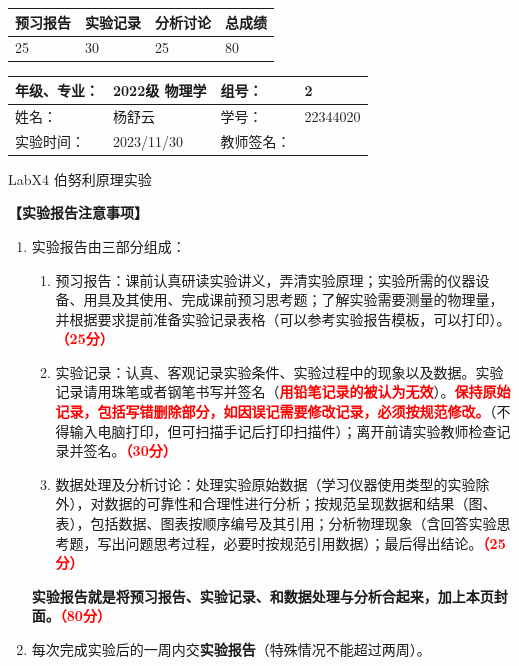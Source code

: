 \documentclass[dvipsnames, svgnames,a4paper,11pt]{article}
\begin{document}
	
	
	
	\begin{table}
		\renewcommand\arraystretch{1.7}
		\begin{tabularx}{\textwidth}{
				|X|X|X|X
				|X|X|X|X|}
			\hline
			\multicolumn{2}{|c|}{预习报告}&\multicolumn{2}{|c|}{实验记录}&\multicolumn{2}{|c|}{分析讨论}&\multicolumn{2}{|c|}{总成绩}\\
			\hline
			\LARGE25 & & \LARGE30 & & \LARGE25 & & \LARGE80 & \\
			\hline
		\end{tabularx}
	\end{table}
	
	\begin{table}
		\renewcommand\arraystretch{1.7}
		\begin{tabularx}{\textwidth}{|X|X|X|X|}
			\hline
			年级、专业： & 2022级 物理学 &组号： & 2\\
			\hline
			姓名： & 杨舒云  & 学号： & 22344020\\
			\hline
			实验时间： & 2023/11/30 & 教师签名： & \\
			\hline
		\end{tabularx}
	\end{table}
	
	\begin{center}
		\LARGE LabX4 \quad 伯努利原理实验
	\end{center}
	
	\textbf{【实验报告注意事项】}
	\begin{enumerate}
		\item 实验报告由三部分组成：
		\begin{enumerate}
			\item 预习报告：课前认真研读实验讲义，弄清实验原理；实验所需的仪器设备、用具及其使用、完成课前预习思考题；了解实验需要测量的物理量，并根据要求提前准备实验记录表格（可以参考实验报告模板，可以打印）。\textcolor{red}{\textbf{（25分）}}
			\item 实验记录：认真、客观记录实验条件、实验过程中的现象以及数据。实验记录请用珠笔或者钢笔书写并签名（\textcolor{red}{\textbf{用铅笔记录的被认为无效}}）。\textcolor{red}{\textbf{保持原始记录，包括写错删除部分，如因误记需要修改记录，必须按规范修改。}}（不得输入电脑打印，但可扫描手记后打印扫描件）；离开前请实验教师检查记录并签名。\textcolor{red}{\textbf{（30分）}}
			\item 数据处理及分析讨论：处理实验原始数据（学习仪器使用类型的实验除外），对数据的可靠性和合理性进行分析；按规范呈现数据和结果（图、表），包括数据、图表按顺序编号及其引用；分析物理现象（含回答实验思考题，写出问题思考过程，必要时按规范引用数据）；最后得出结论。\textcolor{red}{\textbf{（25分）}}
		\end{enumerate}
		\textbf{实验报告就是将预习报告、实验记录、和数据处理与分析合起来，加上本页封面。\textcolor{red}{（80分）}}
		\item 每次完成实验后的一周内交\textbf{实验报告}（特殊情况不能超过两周）。
	\end{enumerate}
	
\end{document}
